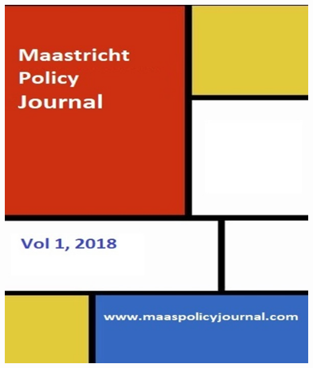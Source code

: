 \documentclass[journal,noindent,headline,12pt]{paper}
\begin{document}
\begin{titlepage} 
\begin{center}
	\includegraphics[scale=1.5]{cover2}
\end{center}
\end{titlepage}
\end{document}
